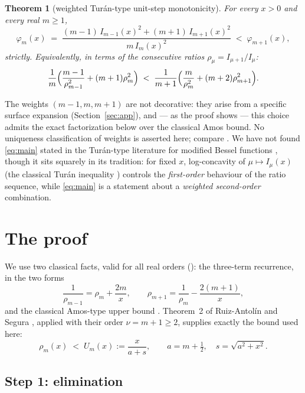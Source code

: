 \documentclass[11pt]{article}
\newtheorem{theorem}{Theorem}
\theoremstyle{remark}
\begin{document}
\begin{theorem}[weighted Tur\'an-type unit-step monotonicity]
\label{thm:main}
For every $x > 0$ and every real $m \ge 1$,
\begin{equation}
\label{eq:main}
\varphi_m(x) \;=\;
\frac{(m-1)\,I_{m-1}(x)^2 + (m+1)\,I_{m+1}(x)^2}{m\,I_m(x)^2}
\;<\; \varphi_{m+1}(x),
\end{equation}
strictly. Equivalently, in terms of the consecutive ratios
$\rho_\mu = I_{\mu+1}/I_\mu$:
\[
\frac1m\Bigl(\frac{m-1}{\rho_{m-1}^2} + (m+1)\rho_m^2\Bigr)
\;<\;
\frac1{m+1}\Bigl(\frac{m}{\rho_m^2} + (m+2)\rho_{m+1}^2\Bigr).
\]
\end{theorem}

The weights $(m-1, m, m+1)$ are not decorative: they arise from a
specific surface expansion (Section~\ref{sec:app}), and --- as the
proof shows --- this choice admits the exact factorization below over the classical Amos
bound. No uniqueness classification of weights is asserted here; compare
\cite{Amos, Segura2011, RuizSegura}. We have not found
\eqref{eq:main} stated in the Tur\'an-type literature for modified
Bessel functions \cite{TN, Baricz1010, BariczTuranians}, though it
sits squarely in its tradition: for fixed $x$, log-concavity of
$\mu \mapsto I_\mu(x)$ (the classical Tur\'an inequality
\cite{TN, Baricz1010}) controls the \emph{first-order} behaviour of
the ratio sequence, while \eqref{eq:main} is a statement about a
\emph{weighted second-order} combination.

\section{The proof}

We use two classical facts, valid for all real orders
(\cite[10.29.1]{DLMF}): the three-term recurrence, in the two forms
\begin{equation}
\label{eq:rec}
\frac{1}{\rho_{m-1}} = \rho_m + \frac{2m}{x},
\qquad
\rho_{m+1} = \frac{1}{\rho_m} - \frac{2(m+1)}{x},
\end{equation}
and the classical Amos-type upper bound \cite{Amos,Segura2011}.
Theorem~2 of Ruiz-Antol\'in and Segura \cite{RuizSegura}, applied
with their order $\nu=m+1\ge2$, supplies exactly the bound used here:
\begin{equation}
\label{eq:amos}
\rho_m(x) \;<\; U_m(x) := \frac{x}{a + s},
\qquad a = m + \tfrac12,\quad s = \sqrt{a^2 + x^2}.
\end{equation}

\subsection*{Step 1: elimination}
\end{document}
